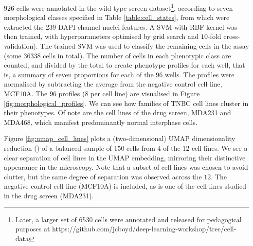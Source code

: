 $926$ cells were annotated in the wild type screen dataset\footnote{Later, a larger set of 6530 cells were annotated and released for pedagogical purposes at https://github.com/jcboyd/deep-learning-workshop/tree/cell-data}, according to seven morphological classes specified in Table \ref{table:cell_states}, from which were extracted the 239 DAPI-channel nuclei features. A SVM with RBF kernel was then trained, with hyperparameters optimised by grid search and $10$-fold cross-validation). The trained SVM was used to classify the remaining cells in the assay (some $36338$ cells in total). The number of cells in each phenotypic class are counted, and divided by the total to create phenotype profiles for each well, that is, a summary of seven proportions for each of the $96$ wells. The profiles were normalised by subtracting the average from the negative control cell line, MCF10A. The $96$ profiles ($8$ per cell line) are visualised in Figure \ref{fig:morphological_profiles}. We can see how families of TNBC cell lines cluster in their phenotypes. Of note are the cell lines of the drug screen, MDA231 and MDA468, which manifest predominantly normal interphase cells.

Figure \ref{fig:umap_cell_lines} plots a (two-dimensional) UMAP dimensionality reduction (\cite{mcinnes2018umap}) of a balanced sample of $150$ cells from $4$ of the $12$ cell lines. We see a clear separation of cell lines in the UMAP embedding, mirroring their distinctive appearance in the microscopy. Note that a subset of cell lines was chosen to avoid clutter, but the same degree of separation was observed across the $12$. The negative control cell line (MCF10A) is included, as is one of the cell lines studied in the drug screen (MDA231).

